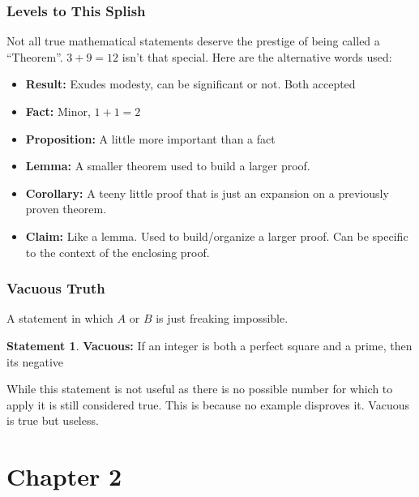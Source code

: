 \documentclass{article}
\theoremstyle{definition}
\theoremstyle{definition}
\newtheorem{stmt}[thm]{Statement}
\begin{document}
\subsubsection*{Levels to This Splish}
Not all true mathematical statements deserve the prestige of being called a ``Theorem''.
$3+9=12$ isn't that special. Here are the alternative words used:
\begin{itemize}
    \item\textbf{Result:} Exudes modesty, can be significant or not. Both accepted
    \item\textbf{Fact:} Minor, $1+1=2$
    \item\textbf{Proposition:} A little more important than a fact
    \item\textbf{Lemma:} A smaller theorem used to build a larger proof.
    \item\textbf{Corollary:} A teeny little proof that is just an expansion on
        a previously proven theorem.
    \item\textbf{Claim:} Like a lemma. Used to build/organize a larger proof. Can be
        specific to the context of the enclosing proof.
\end{itemize}

\subsubsection*{Vacuous Truth}
A statement in which $A$ or $B$ is just freaking impossible.
\begin{stmt}
    \textbf{Vacuous:} If an integer is both a perfect square and a prime, then its negative 
\end{stmt}
While this statement is not useful as there is no possible number for which to apply it is 
still considered true. This is because no example disproves it. Vacuous is true but useless.

\newpage
\section*{Chapter 2}
\end{document}
